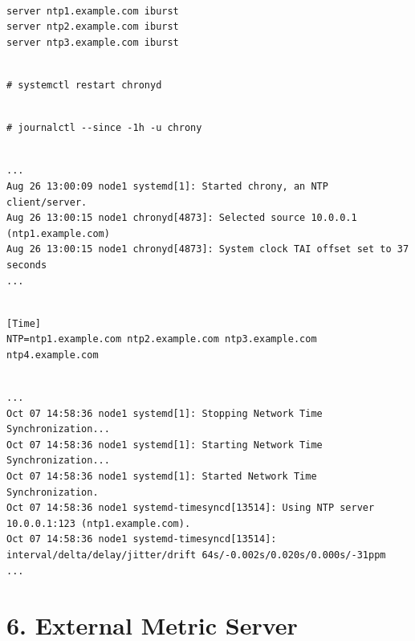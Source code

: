 \begin{lstlisting}

server ntp1.example.com iburst
server ntp2.example.com iburst
server ntp3.example.com iburst

\end{lstlisting}

\begin{lstlisting}

# systemctl restart chronyd

\end{lstlisting}

\begin{lstlisting}

# journalctl --since -1h -u chrony

\end{lstlisting}

\begin{lstlisting}

...
Aug 26 13:00:09 node1 systemd[1]: Started chrony, an NTP client/server.
Aug 26 13:00:15 node1 chronyd[4873]: Selected source 10.0.0.1 (ntp1.example.com)
Aug 26 13:00:15 node1 chronyd[4873]: System clock TAI offset set to 37 seconds
...

\end{lstlisting}

\begin{lstlisting}

[Time]
NTP=ntp1.example.com ntp2.example.com ntp3.example.com ntp4.example.com

\end{lstlisting}

\begin{lstlisting}

...
Oct 07 14:58:36 node1 systemd[1]: Stopping Network Time Synchronization...
Oct 07 14:58:36 node1 systemd[1]: Starting Network Time Synchronization...
Oct 07 14:58:36 node1 systemd[1]: Started Network Time Synchronization.
Oct 07 14:58:36 node1 systemd-timesyncd[13514]: Using NTP server 10.0.0.1:123 (ntp1.example.com).
Oct 07 14:58:36 node1 systemd-timesyncd[13514]: interval/delta/delay/jitter/drift 64s/-0.002s/0.020s/0.000s/-31ppm
...

\end{lstlisting}


\section{6. External Metric Server}

